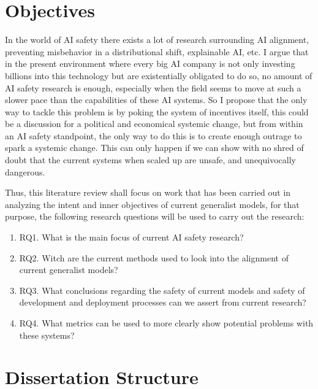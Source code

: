 \section{Objectives}

In the world of AI safety there exists a lot of research surrounding AI alignment, preventing misbehavior in a distributional shift, explainable AI, etc. I argue that in the present environment where every big AI company is not only investing billions into this technology but are existentially obligated to do so, no amount of AI safety research is enough, especially when the field seems to move at such a slower pace than the capabilities of these AI systems. So I propose that the only way to tackle this problem is by poking the system of incentives itself, this could be a discussion for a political and economical systemic change, but from within an AI safety standpoint, the only way to do this is to create enough outrage to spark a systemic change. This can only happen if we can show with no shred of doubt that the current systems when scaled up are unsafe, and unequivocally dangerous.

Thus, this literature review shall focus on work that has been carried out in analyzing the intent and inner objectives of current generalist models, for that purpose, the following research questions will be used to carry out the research:

\begin{enumerate}
    \item RQ1. What is the main focus of current AI safety research?  
    \item RQ2. Witch are the current methods used to look into the alignment of current generalist models?
    \item RQ3. What conclusions regarding the safety of current models and safety of development and deployment processes can we assert from current research?
    \item RQ4. What metrics can be used to more clearly show potential problems with these systems? 
\end{enumerate}

\section{Dissertation Structure}

\newpage